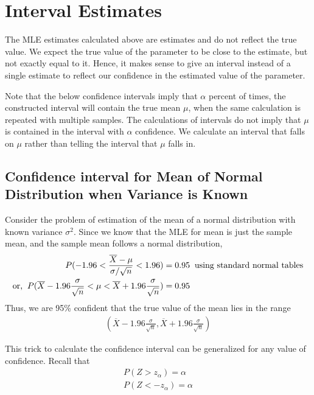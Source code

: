 \documentclass[../probability-notes.tex]{subfiles}
\begin{document}
    
    \section{Interval Estimates}
    The MLE estimates calculated above are estimates and do not reflect the true value. We expect the true value of the parameter to be close to the estimate, but not exactly equal to it. Hence, it makes sense to give an interval instead of a single estimate to reflect our confidence in the estimated value of the parameter.\newline

    Note that the below confidence intervals imply that $\alpha$ percent of times, the constructed interval will contain the true mean $\mu$, when the same calculation is repeated with multiple samples. The calculations of intervals do not imply that $\mu$ is contained in the interval with $\alpha$ confidence. We calculate an interval that falls on $\mu$ rather than telling the interval that $\mu$ falls in.\newline

    \subsection{Confidence interval for Mean of Normal Distribution when Variance is Known}
    Consider the problem of estimation of the mean of a normal distribution with known variance $\sigma^{2}$. Since we know that the MLE for mean is just the sample mean, and the sample mean follows a normal distribution,
    \begin{align*}
        P(-1.96 < \frac{\overline{X} - \mu}{\sigma / \sqrt{n}} < 1.96) &= 0.95 \text{\: using standard normal tables}\\
        \text{or, \:} P(\overline{X} - 1.96\frac{\sigma}{\sqrt{n}}< \mu < \overline{X} + 1.96\frac{\sigma}{\sqrt{n}}) &= 0.95
    \end{align*}
    Thus, we are 95\% confident that the true value of the mean lies in the range 
    \begin{align*}
        (\overline{X} - 1.96\frac{\sigma}{\sqrt{n}}, \overline{X} + 1.96\frac{\sigma}{\sqrt{n}})
    \end{align*}

    This trick to calculate the confidence interval can be generalized for any value of confidence. Recall that
    \begin{align*}
        P(Z > z_{\alpha}) = \alpha\\
        P(Z < -z_{\alpha}) = \alpha
    \end{align*}
\end{document}

